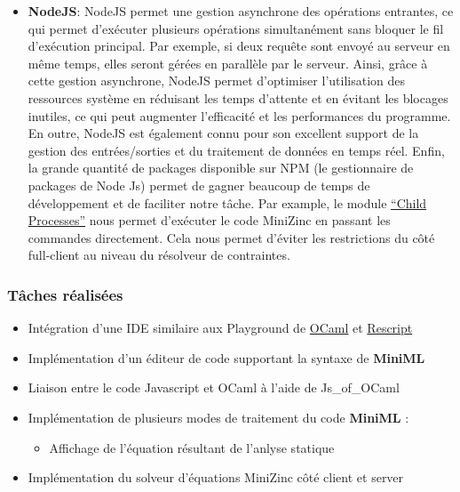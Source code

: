 \documentclass[
  12pt,
]{article}
\providecommand{\tightlist}{%
  \setlength{\itemsep}{0pt}\setlength{\parskip}{0pt}}
\begin{document}
\begin{itemize}
\tightlist
\item
  \textbf{NodeJS}: NodeJS permet une gestion asynchrone des opérations
  entrantes, ce qui permet d'exécuter plusieurs opérations simultanément
  sans bloquer le fil d'exécution principal. Par exemple, si deux
  requête sont envoyé au serveur en même temps, elles seront gérées en
  parallèle par le serveur. Ainsi, grâce à cette gestion asynchrone,
  NodeJS permet d'optimiser l'utilisation des ressources système en
  réduisant les temps d'attente et en évitant les blocages inutiles, ce
  qui peut augmenter l'efficacité et les performances du programme. En
  outre, NodeJS est également connu pour son excellent support de la
  gestion des entrées/sorties et du traitement de données en temps réel.
  Enfin, la grande quantité de packages disponible sur NPM (le
  gestionnaire de packages de Node Js) permet de gagner beaucoup de
  temps de développement et de faciliter notre tâche. Par example, le
  module \href{https://nodejs.org/api/child_process.html}{``Child
  Processes''} nous permet d'exécuter le code MiniZinc en passant les
  commandes directement. Cela nous permet d'éviter les restrictions du
  côté full-client au niveau du résolveur de contraintes.
\end{itemize}

\hypertarget{tuxe2ches-ruxe9alisuxe9es-1}{%
\subsubsection{Tâches réalisées}\label{tuxe2ches-ruxe9alisuxe9es-1}}

\begin{itemize}
\tightlist
\item
  Intégration d'une IDE similaire aux Playground de
  \href{https://OCaml.org/play}{OCaml} et
  \href{https://rescript-lang.org/try}{Rescript}
\item
  Implémentation d'un éditeur de code supportant la syntaxe de
  \textbf{MiniML}
\item
  Liaison entre le code Javascript et OCaml à l'aide de Js\_of\_OCaml
\item
  Implémentation de plusieurs modes de traitement du code
  \textbf{MiniML} :

  \begin{itemize}
  \tightlist
  \item
    Affichage de l'équation résultant de l'anlyse statique
  \end{itemize}
\item
  Implémentation du solveur d'équations MiniZinc côté client et server
\end{itemize}
\end{document}
